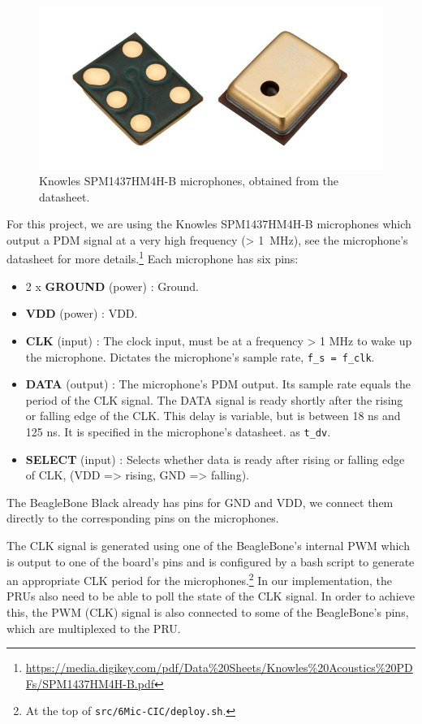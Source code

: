 \documentclass[]{report}
\providecommand{\tightlist}{%
	\setlength{\itemsep}{0pt}\setlength{\parskip}{0pt}}
\begin{document}
\begin{figure}[H]
\centering
\includegraphics[width=0.6\linewidth]{Pictures/mics.png}
\caption{Knowles SPM1437HM4H-B microphones, obtained from the datasheet.}
\end{figure}

For this project, we are using the Knowles SPM1437HM4H-B microphones
which output a PDM signal at a very high frequency (\textgreater{} 1~MHz), see the microphone's datasheet for more
details.\footnote{\url{https://media.digikey.com/pdf/Data\%20Sheets/Knowles\%20Acoustics\%20PDFs/SPM1437HM4H-B.pdf}} Each microphone has six pins:

\begin{itemize}
\tightlist
\item
  2 x \textbf{GROUND} (power) : Ground.
\item
  \textbf{VDD} (power) : VDD.
\item
  \textbf{CLK} (input) : The clock input, must be at a frequency
  \textgreater{} 1 MHz to wake up the microphone. Dictates the
  microphone's sample rate, \texttt{f\_s\ =\ f\_clk}.
\item
  \textbf{DATA} (output) : The microphone's PDM output. Its sample rate
  equals the period of the CLK signal. The DATA signal is ready shortly
  after the rising or falling edge of the CLK. This delay is variable,
  but is between 18 ns and 125 ns. It is specified in the microphone's datasheet.
  as \texttt{t\_dv}.
\item
  \textbf{SELECT} (input) : Selects whether data is ready after rising
  or falling edge of CLK, (VDD =\textgreater{} rising, GND
  =\textgreater{} falling).
\end{itemize}

The BeagleBone Black already has pins for GND and VDD, we connect them directly to the corresponding pins on the microphones.

The CLK signal is generated using one of the BeagleBone's internal PWM which is output to one of the board's pins and is configured by a bash script to generate an appropriate CLK period for the microphones.\footnote{At the top of \texttt{src/6Mic-CIC/deploy.sh}.} In our implementation, the PRUs also need to be able to poll the state of the CLK signal. In order to achieve this, the PWM (CLK) signal is also connected to some of the BeagleBone's pins, which are multiplexed to the PRU.
\end{document}
